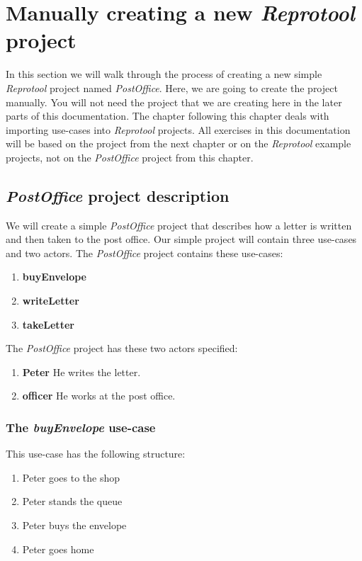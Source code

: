 \section{Manually creating a new \emph{Reprotool} project}

In this section we will walk through the process of creating a new simple \emph{Reprotool} project named \emph{PostOffice}.
Here, we are going to create the project manually. You will not need the project that we are creating here in the later parts
of this documentation. The chapter following this chapter deals with importing use-cases into \emph{Reprotool} projects.
All exercises in this documentation will be based on the project from the next chapter or on the \emph{Reprotool} example projects,
not on the \emph{PostOffice} project from this chapter.

\subsection{\emph{PostOffice} project description}
We will create a simple \emph{PostOffice} project that describes how a letter is written and then taken to the post office.
Our simple project will contain three use-cases and two actors. The \emph{PostOffice} project contains these use-cases:

\begin{enumerate}
 \item {\bf buyEnvelope}
 \item {\bf writeLetter}
 \item {\bf takeLetter}
\end{enumerate}

The \emph{PostOffice} project has these two actors specified:

\begin{enumerate}
 \item {\bf Peter} He writes the letter.
 \item {\bf officer} He works at the post office.
\end{enumerate}

\subsubsection{The \emph{buyEnvelope} use-case}

This use-case has the following structure:

\begin{enumerate}
 \item Peter goes to the shop
 \item Peter stands the queue
 \item Peter buys the envelope
 \item Peter goes home
\end{enumerate}

